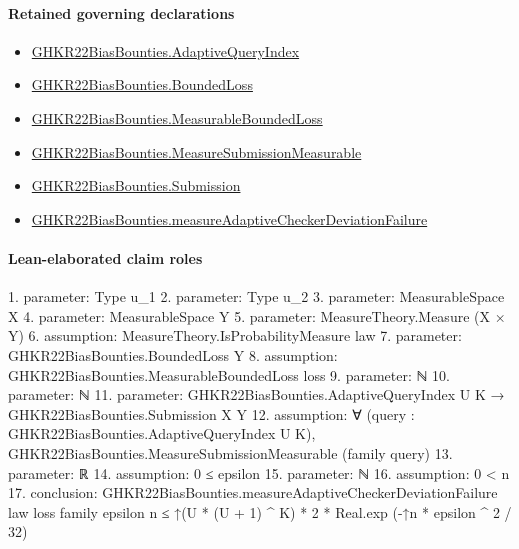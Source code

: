\documentclass[10pt]{article}
\begin{document}
\paragraph{Retained governing declarations}
\begin{itemize}\raggedright
\item \hyperlink{governing-declaration-6b8ee8407ab2cc56}{GHKR22\allowbreak{}Bias\allowbreak{}Bounties.\allowbreak{}Adaptive\allowbreak{}Query\allowbreak{}Index}
\item \hyperlink{paper-prerequisite-ef6c319b0770dad4}{GHKR22\allowbreak{}Bias\allowbreak{}Bounties.\allowbreak{}Bounded\allowbreak{}Loss}
\item \hyperlink{governing-declaration-56b96e1cde76e3f7}{GHKR22\allowbreak{}Bias\allowbreak{}Bounties.\allowbreak{}Measurable\allowbreak{}Bounded\allowbreak{}Loss}
\item \hyperlink{governing-declaration-06764dde54db369e}{GHKR22\allowbreak{}Bias\allowbreak{}Bounties.\allowbreak{}Measure\allowbreak{}Submission\allowbreak{}Measurable}
\item \hyperlink{governing-declaration-e9890aa090ac9d70}{GHKR22\allowbreak{}Bias\allowbreak{}Bounties.\allowbreak{}Submission}
\item \hyperlink{governing-declaration-b664fbe1f3de2c4c}{GHKR22\allowbreak{}Bias\allowbreak{}Bounties.\allowbreak{}measure\allowbreak{}Adaptive\allowbreak{}Checker\allowbreak{}Deviation\allowbreak{}Failure}
\end{itemize}
\paragraph{Lean-elaborated claim roles}\begin{ReviewVerbatim}
1. parameter: Type u_1
2. parameter: Type u_2
3. parameter: MeasurableSpace X
4. parameter: MeasurableSpace Y
5. parameter: MeasureTheory.Measure (X × Y)
6. assumption: MeasureTheory.IsProbabilityMeasure law
7. parameter: GHKR22BiasBounties.BoundedLoss Y
8. assumption: GHKR22BiasBounties.MeasurableBoundedLoss loss
9. parameter: ℕ
10. parameter: ℕ
11. parameter: GHKR22BiasBounties.AdaptiveQueryIndex U K → GHKR22BiasBounties.Submission X Y
12. assumption: ∀ (query : GHKR22BiasBounties.AdaptiveQueryIndex U K), GHKR22BiasBounties.MeasureSubmissionMeasurable (family query)
13. parameter: ℝ
14. assumption: 0 ≤ epsilon
15. parameter: ℕ
16. assumption: 0 < n
17. conclusion: GHKR22BiasBounties.measureAdaptiveCheckerDeviationFailure law loss family epsilon n ≤
  ↑(U * (U + 1) ^ K) * 2 * Real.exp (-↑n * epsilon ^ 2 / 32)
\end{ReviewVerbatim}
\end{document}
